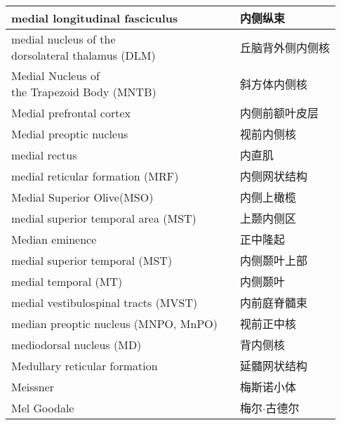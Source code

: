 \begin{longtable}{lll}
	\midrule
	medial longitudinal fasciculus   && 内侧纵束  \\
	
	\midrule
	\makecell[l]{medial nucleus of the\\ dorsolateral thalamus (DLM)}  && 丘脑背外侧内侧核  \\
	
	\midrule
	\makecell[l]{Medial Nucleus of \\the Trapezoid Body (MNTB)}   && 斜方体内侧核  \\
	
	\midrule
	Medial prefrontal cortex    && 内侧前额叶皮层  \\
	
	\midrule
	Medial preoptic nucleus    && 视前内侧核  \\
	
	\midrule
	medial rectus    && 内直肌  \\
	
	\midrule
	medial reticular formation (MRF)    && 内侧网状结构  \\
	
	\midrule
	Medial Superior Olive(MSO)   && 内侧上橄榄  \\
	
	\midrule
	medial superior temporal area (MST)   && 上颞内侧区  \\
	
	\midrule
	Median eminence   && 正中隆起  \\
	
	\midrule
	medial superior temporal (MST)   && 内侧颞叶上部  \\
	
	\midrule
	medial temporal (MT)   && 内侧颞叶  \\
	
	\midrule
	medial vestibulospinal tracts (MVST) && 内前庭脊髓束  \\
	
	\midrule
	median preoptic nucleus (MNPO, MnPO) && 视前正中核  \\
	
	\midrule
	mediodorsal nucleus (MD) && 背内侧核  \\
	
	\midrule
	Medullary reticular formation && 延髓网状结构  \\
	
	\midrule
	Meissner && 梅斯诺小体  \\
	
	\midrule
	Mel Goodale && 梅尔$\cdot$古德尔  \\
	

\end{longtable}
